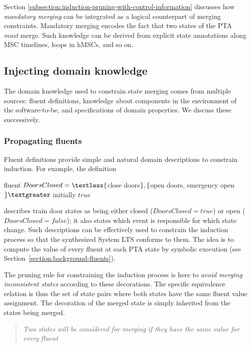 Section \ref{subsection:induction-pruning-with-control-information} discusses how \emph{mandatory merging} can be integrated as a logical counterpart of merging constraints. Mandatory merging encodes the fact that two states of the PTA \emph{must} merge. Such knowledge can be derived from explicit state annotations along MSC timelines, loops in hMSCs, and so on. 
 

\subsection{Injecting domain knowledge\label{subsection:induction-pruning-with-domain-knowledge}}

The domain knowledge used to constrain state merging comes from multiple sources: fluent definitions, knowledge about components in the environment of the software-to-be, and specifications of domain properties. We discuss these successively.


\subsubsection*{Propagating fluents}

Fluent definitions provide simple and natural domain descriptions to constrain induction. For example, the definition

\begin{center}
fluent $DoorsClosed = \textless \{$close doors$\}, \newline
 \{$open doors, emergency open$\} \textgreater $ initially $true$ \\
\end{center}

\noindent describes train door states as being either closed ($DoorsClosed = true$) or open ($DoorsClosed = false$); it also states which event is responsible for which state change. Such descriptions can be effectively used to constrain the induction process so that the synthesized System LTS conforms to them. The idea is to compute the value of every fluent at each PTA state by symbolic execution (see Section~\ref{section:background-fluents}). 

The pruning rule for constraining the induction process is here to \emph{avoid merging inconsistent states} according to these decorations. The specific equivalence relation is thus the set of state pairs where both states have the same fluent value assignment. The decoration of the merged state is simply inherited from the states being merged.
\begin{quote}
\emph{Two states will be considered for merging if they have the same value for every fluent}
\end{quote}

